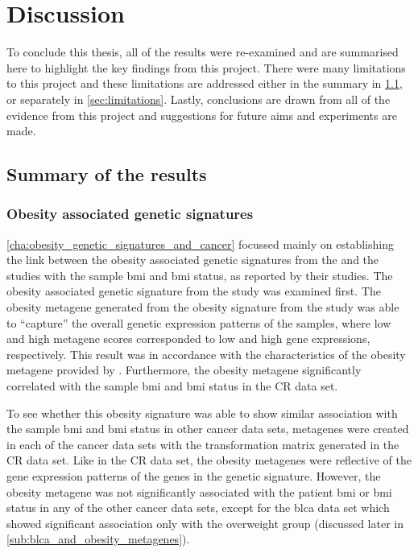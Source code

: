 \chapter{Discussion}
\label{cha:discussion}

To conclude this thesis, all of the results were re-examined and are summarised here to highlight the key findings from this project.
There were many limitations to this project and these limitations are addressed either in the summary in \cref{sec:summary_of_the_results}, or separately in \cref{sec:limitations}.
Lastly, conclusions are drawn from all of the evidence from this project and suggestions for future aims and experiments are made.


\section{Summary of the results}
\label{sec:summary_of_the_results}

\subsection{Obesity associated genetic signatures}
\label{sub:obesity_associated_genetic_signatures}

\cref{cha:obesity_genetic_signatures_and_cancer} focussed mainly on establishing the link between the obesity associated genetic signatures from the \citet{Creighton2012} and the \citet{Fuentes-Mattei2014} studies with the sample \gls{bmi} and \gls{bmi} status, as reported by their studies.
The obesity associated genetic signature from the \citet{Creighton2012} study was examined first.
The obesity metagene generated from the obesity signature from the \citet{Creighton2012} study was able to ``capture'' the overall genetic expression patterns of the samples, where low and high metagene scores  corresponded to low and high gene expressions, respectively.
This result was in accordance with the characteristics of the obesity metagene provided by \citet{Creighton2012}.
Furthermore, the obesity metagene significantly correlated with the sample \gls{bmi} and \gls{bmi} status in the CR data set.

To see whether this obesity signature was able to show similar association with the sample \gls{bmi} and \gls{bmi} status in other cancer data sets, metagenes were created in each of the cancer data sets with the transformation matrix generated in the CR  data set.
Like in the CR  data set, the obesity metagenes were reflective of the gene expression patterns of the genes in the genetic signature.
However, the obesity metagene was not significantly associated with the patient \gls{bmi} or \gls{bmi} status in any of the other cancer data sets, except for  the \gls{blca} data set which showed significant association only with the overweight group (discussed later in \cref{sub:blca_and_obesity_metagenes}).

